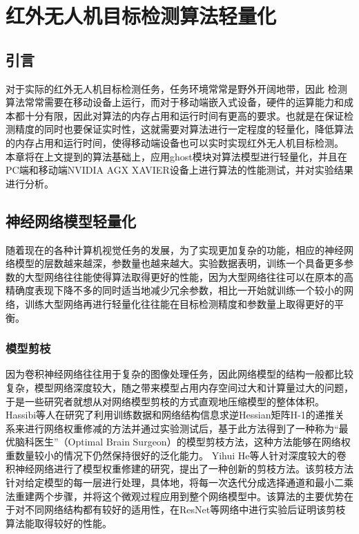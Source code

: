 
\chapter{红外无人机目标检测算法轻量化}

\section{引言}
对于实际的红外无人机目标检测任务，任务环境常常是野外开阔地带，因此
检测算法常常需要在移动设备上运行，而对于移动端嵌入式设备，硬件的运算能力和成本都十分有限，因此对算法的内存占用和运行时间有更高的要求。也就是在保证检测精度的同时也要保证实时性，这就需要对算法进行一定程度的轻量化，降低算法的内存占用和运行时间，使得移动端设备也可以实时实现红外无人机目标检测。
本章将在上文提到的算法基础上，应用ghost模块对算法模型进行轻量化，并且在PC端和移动端NVIDIA AGX XAVIER设备上进行算法的性能测试，并对实验结果进行分析。

\section{神经网络模型轻量化}
随着现在的各种计算机视觉任务的发展，为了实现更加复杂的功能，相应的神经网络模型的层数越来越深，参数量也越来越大。实验数据表明，训练一个具备更多参数的大型网络往往能使得算法取得更好的性能，因为大型网络往往可以在原本的高精确度表现下降不多的同时适当地减少冗余参数，相比一开始就训练一个较小的网络，训练大型网络再进行轻量化往往能在目标检测精度和参数量上取得更好的平衡。

\subsection{模型剪枝}
因为卷积神经网络往往用于复杂的图像处理任务，因此网络模型的结构一般都比较复杂，模型网络深度较大，随之带来模型占用内存空间过大和计算量过大的问题，于是一些研究者就想从对网络模型剪枝的方式直观地压缩模型的整体体积。
Hassibi等人\cite{hassibi1992second}在研究了利用训练数据和网络结构信息求逆Hessian矩阵H-1的递推关系来进行网络权重修减的方法并通过实验测试后，基于此方法得到了一种称为“最优脑科医生”（Optimal Brain Surgeon）的模型剪枝方法，这种方法能够在网络权重数量较小的情况下仍然保持很好的泛化能力。
Yihui He等人\cite{he2017channel}针对深度较大的卷积神经网络进行了模型权重修建的研究，提出了一种创新的剪枝方法。该剪枝方法针对给定模型的每一层进行处理，具体地，将每一次迭代分成选择通道和最小二乘法重建两个步骤，并将这个微观过程应用到整个网络模型中。该算法的主要优势在于对不同网络结构都有较好的适用性，在ResNet等网络中进行实验后证明该剪枝算法能取得较好的性能。

